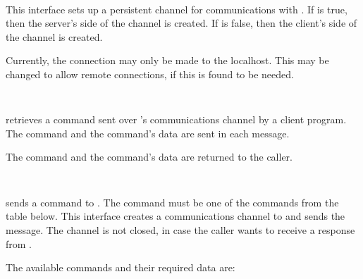 \begin{description}

\item {}\verb" "

This interface sets up a persistent channel for communications with
.  If  is true, then the server's side of the
channel is created.  If  is false, then the client's side of
the channel is created.

Currently, the connection may only be made to the localhost.  This may be
changed to allow remote connections, if this is found to be needed.

\item {}\verb" "

 retrieves a command sent over 's
communications channel by a client program.  The command and the command's
data are sent in each message.

The command and the command's data are returned to the caller.

\item {}\verb" "

 sends a command to .  The command must
be one of the commands from the table below.  This interface creates a
communications channel to  and sends the message.  The channel is
not closed, in case the caller wants to receive a response from .

The available commands and their required data are:


\end{description}
